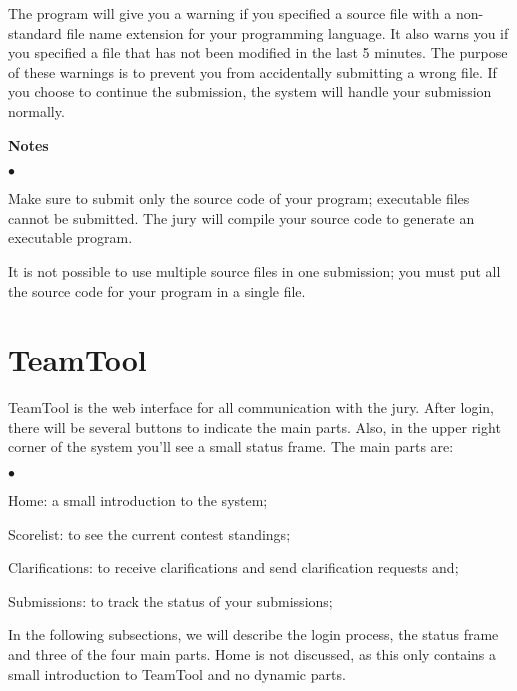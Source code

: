 \documentclass[a4paper]{artikel3}
\newcommand{\strong}[1]{\textbf{#1}}
\newenvironment{citemize}
  {\begin{list}{$\bullet$}{\topsep 0cm \itemsep 0cm}}
  {\end{list}}
\begin{document}
The program will give you a warning if you specified a source file with a
non-standard file name extension for your programming language. It also
warns you if you specified a file that has not been modified in the last 5
minutes. The purpose of these warnings is to prevent you from accidentally
submitting a wrong file. If you choose to continue the submission, the
system will handle your submission normally.

\strong{Notes}
\begin{citemize}
\item Make sure to submit only the source code of your program; executable
files cannot be submitted. The jury will compile your source code to
generate an executable program.

\item It is not possible to use multiple source files in one submission; you
must put all the source code for your program in a single file.
\end{citemize}

\vspace{-0.8cm}
\section{TeamTool}

TeamTool is the web interface for all communication with the jury. After
login, there will be several buttons to indicate the main parts. Also, in
the upper right corner of the system you'll see a small status frame. The
main parts are:

\begin{citemize}
\item[Home:] a small introduction to the system;

\item[Scorelist:] to see the current contest standings;

\item[Clarifications:] to receive clarifications and send clarification
requests and;

\item[Submissions:] to track the status of your submissions;
\end{citemize}

In the following subsections, we will describe the login process, the status
frame and three of the four main parts. Home is not discussed, as this only
contains a small introduction to TeamTool and no dynamic parts.

\vspace{-0.3cm}
\end{document}
